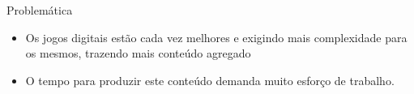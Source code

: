 \begin{frame}{Problemática}
    \begin{itemize} \setlength\itemsep{1em}
        \item Os jogos digitais estão cada vez melhores e exigindo mais
        complexidade para os mesmos, trazendo mais conteúdo agregado
        \item O tempo para produzir este conteúdo demanda muito esforço de trabalho.
    \end{itemize}
\end{frame}